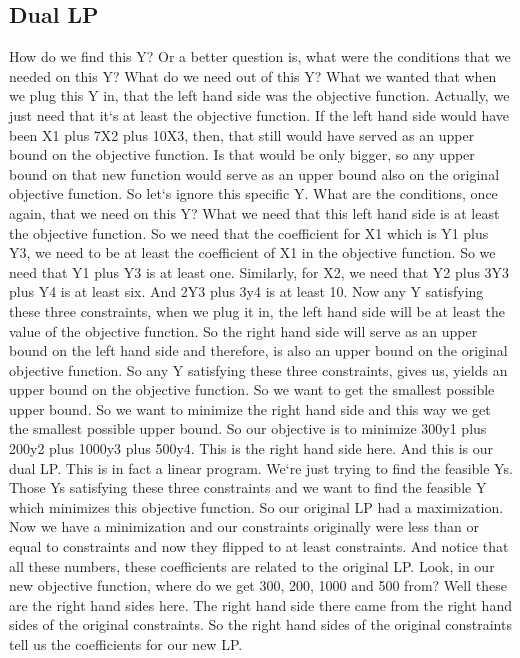 \subsection{Dual LP}
How do we find this Y? Or a better question is, what were the conditions that we needed on this Y? What do we need out of this Y? What we wanted that when we plug this Y in, that the left hand side was the objective function.
Actually, we just need that it`s at least the objective function.
If the left hand side would have been X1 plus 7X2 plus 10X3, then, that still would have served as an upper bound on the objective function.
Is that would be only bigger, so any upper bound on that new function would serve as an upper bound also on the original objective function.
So let`s ignore this specific Y\@.
What are the conditions, once again, that we need on this Y? What we need that this left hand side is at least the objective function.
So we need that the coefficient for X1 which is Y1 plus Y3, we need to be at least the coefficient of X1 in the objective function.
So we need that Y1 plus Y3 is at least one.
Similarly, for X2, we need that Y2 plus 3Y3 plus Y4 is at least six.
And 2Y3 plus 3y4 is at least 10.
Now any Y satisfying these three constraints, when we plug it in, the left hand side will be at least the value of the objective function.
So the right hand side will serve as an upper bound on the left hand side and therefore, is also an upper bound on the original objective function.
So any Y satisfying these three constraints, gives us, yields an upper bound on the objective function.
So we want to get the smallest possible upper bound.
So we want to minimize the right hand side and this way we get the smallest possible upper bound.
So our objective is to minimize 300y1 plus 200y2 plus 1000y3 plus 500y4.
This is the right hand side here.
And this is our dual LP\@.
This is in fact a linear program.
We`re just trying to find the feasible Ys.
Those Ys satisfying these three constraints and we want to find the feasible Y which minimizes this objective function.
So our original LP had a maximization.
Now we have a minimization and our constraints originally were less than or equal to constraints and now they flipped to at least constraints.
And notice that all these numbers, these coefficients are related to the original LP\@.
Look, in our new objective function, where do we get 300, 200, 1000 and 500 from? Well these are the right hand sides here.
The right hand side there came from the right hand sides of the original constraints.
So the right hand sides of the original constraints tell us the coefficients for our new LP\@.
